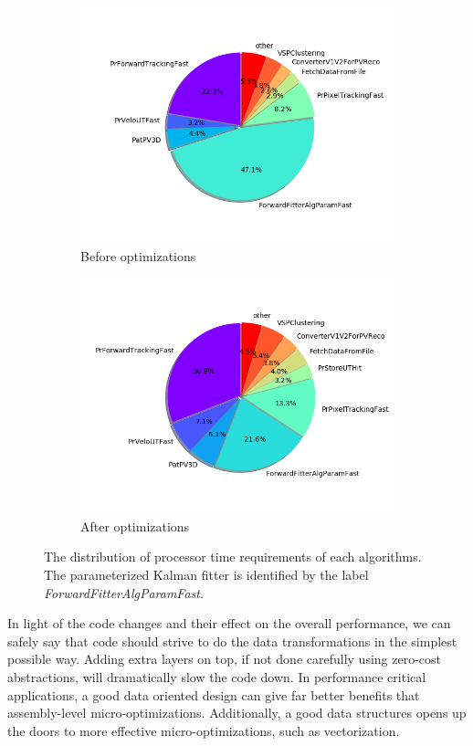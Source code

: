 \documentclass[12pt]{article}
\begin{document}
\begin{figure}[H]
	\centering
	\begin{subfigure}{.5\textwidth}
		\centering
		\includegraphics[width=.9\linewidth]{algo_usage_original_bestphys}
		\caption{Before optimizations}
	\end{subfigure}%
	\begin{subfigure}{.5\textwidth}
		\centering
		\includegraphics[width=.9\linewidth]{algo_usage_optkalman_bestphys}
		\caption{After optimizations}
	\end{subfigure}
	\caption{The distribution of processor time requirements of each algorithms. The parameterized Kalman fitter is identified by the label \textit{ForwardFitterAlgParamFast}.}
	\label{fig_kalmanfit_results_algousage}
\end{figure}

In light of the code changes and their effect on the overall performance, we can safely say that code should strive to do the data transformations in the simplest possible way. Adding extra layers on top, if not done carefully using zero-cost abstractions, will dramatically slow the code down. In performance critical applications, a good data oriented design can give far better benefits that assembly-level micro-optimizations. Additionally, a good data structures opens up the doors to more effective micro-optimizations, such as vectorization.
\end{document}
